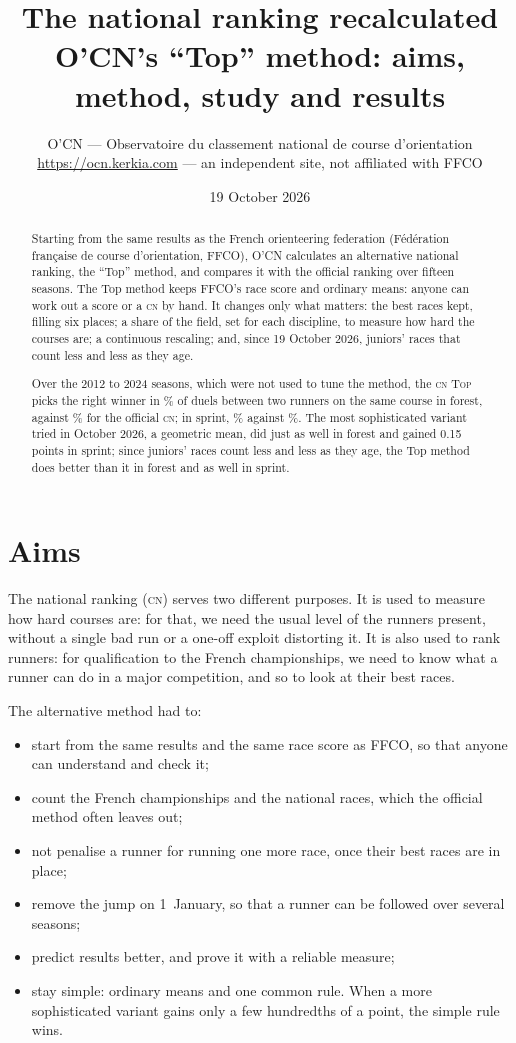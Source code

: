 \documentclass[11pt,a4paper]{article}
\title{The national ranking recalculated\\\large O'CN's ``Top'' method: aims, method, study and results}
\author{O'CN — Observatoire du classement national de course d'orientation\\\small \url{https://ocn.kerkia.com} — an independent site, not affiliated with FFCO}
\date{19 October 2026}
\newcommand{\Top}{\textsc{Top}}
\newcommand{\CN}{\textsc{cn}}
\begin{document}
\maketitle

\begin{abstract}
Starting from the same results as the French orienteering federation (Fédération française de course d'orientation, FFCO), O'CN calculates an alternative national ranking, the ``Top'' method, and compares it with the official ranking over fifteen seasons. The Top method keeps FFCO's race score and ordinary means: anyone can work out a score or a \CN{} by hand. It changes only what matters: the best races kept, filling six places; a share of the field, set for each discipline, to measure how hard the courses are; a continuous rescaling; and, since 19 October 2026, juniors' races that count less and less as they age.

Over the 2012 to 2024 seasons, which were not used to tune the method, the \CN{} \Top{} picks the right winner in \NaccFtop\% of duels between two runners on the same course in forest, against \NaccFoff\% for the official \CN; in sprint, \NaccStop\% against \NaccSoff\%. The most sophisticated variant tried in October 2026, a geometric mean, did just as well in forest and gained 0.15 points in sprint; since juniors' races count less and less as they age, the Top method does better than it in forest and as well in sprint.
\end{abstract}

\tableofcontents

\section{Aims}

The national ranking (\CN) serves two different purposes. It is used to measure how hard courses are: for that, we need the usual level of the runners present, without a single bad run or a one-off exploit distorting it. It is also used to rank runners: for qualification to the French championships, we need to know what a runner can do in a major competition, and so to look at their best races.

The alternative method had to:
\begin{itemize}
  \item start from the same results and the same race score as FFCO, so that anyone can understand and check it;
  \item count the French championships and the national races, which the official method often leaves out;
  \item not penalise a runner for running one more race, once their best races are in place;
  \item remove the jump on 1~January, so that a runner can be followed over several seasons;
  \item predict results better, and prove it with a reliable measure;
  \item stay simple: ordinary means and one common rule. When a more sophisticated variant gains only a few hundredths of a point, the simple rule wins.
\end{itemize}
\end{document}
